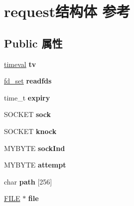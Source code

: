\hypertarget{structrequest}{}\section{request结构体 参考}
\label{structrequest}
\subsection*{Public 属性}
\begin{DoxyCompactItemize}
\item 
\mbox{\label{structrequest_ae177822e315d4e835e3e1dcf78d8e78c}} 
\hyperlink{structtimeval}{timeval} {\bfseries tv}
\item 
\mbox{\label{structrequest_ad47a83fe448df9019c97328867e4efd0}} 
\hyperlink{structfd__set}{fd\+\_\+set} {\bfseries readfds}
\item 
\mbox{\label{structrequest_a63217a9d7203b3eda01d11bffe2d627f}} 
time\+\_\+t {\bfseries expiry}
\item 
\mbox{\label{structrequest_ad821aa4d5ba52b5dcf88e3f0de4cc556}} 
S\+O\+C\+K\+ET {\bfseries sock}
\item 
\mbox{\label{structrequest_a8a71f0673f477f3da4df7026b23f3ae9}} 
S\+O\+C\+K\+ET {\bfseries knock}
\item 
\mbox{\label{structrequest_a07556dad1172f23e704a9debb35f4149}} 
M\+Y\+B\+Y\+TE {\bfseries sock\+Ind}
\item 
\mbox{\label{structrequest_a797addd21273078dc3aeb405cc010dcc}} 
M\+Y\+B\+Y\+TE {\bfseries attempt}
\item 
\mbox{\label{structrequest_a54f7546faa94221cd843532ab9b674e2}} 
char {\bfseries path} \mbox{[}256\mbox{]}
\item 
\mbox{\label{structrequest_a2763df866bc737dc02a8a180ca190857}} 
\hyperlink{struct__iobuf}{F\+I\+LE} $\ast$ {\bfseries file}
\item 
\mbox{\label{structrequest_a20b05babbe923f61583e2d3f1a39b004}} 

\end{DoxyCompactItemize}
